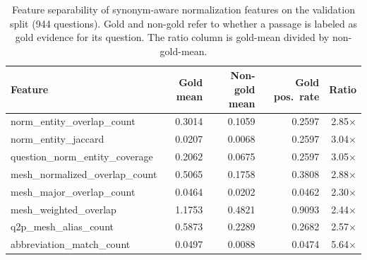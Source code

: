 \begin{table}[htbp]
\centering
\small
\caption{Feature separability of synonym-aware normalization features on the validation split (944 questions). Gold and non-gold refer to whether a passage is labeled as gold evidence for its question. The ratio column is gold-mean divided by non-gold-mean.}
\label{tab:feature-separability}
\begin{tabular}{lrrrr}
\toprule
Feature & Gold mean & Non-gold mean & Gold pos.\ rate & Ratio \\
\midrule
norm\_entity\_overlap\_count & 0.3014 & 0.1059 & 0.2597 & 2.85$\times$ \\
norm\_entity\_jaccard & 0.0207 & 0.0068 & 0.2597 & 3.04$\times$ \\
question\_norm\_entity\_coverage & 0.2062 & 0.0675 & 0.2597 & 3.05$\times$ \\
mesh\_normalized\_overlap\_count & 0.5065 & 0.1758 & 0.3808 & 2.88$\times$ \\
mesh\_major\_overlap\_count & 0.0464 & 0.0202 & 0.0462 & 2.30$\times$ \\
mesh\_weighted\_overlap & 1.1753 & 0.4821 & 0.9093 & 2.44$\times$ \\
q2p\_mesh\_alias\_count & 0.5873 & 0.2289 & 0.2682 & 2.57$\times$ \\
abbreviation\_match\_count & 0.0497 & 0.0088 & 0.0474 & 5.64$\times$ \\
\bottomrule
\end{tabular}
\end{table}
